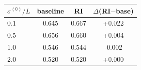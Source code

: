 \begin{tabular}{lccc}
\toprule
$\sigma^{(0)}/L$ & baseline & RI & $\Delta$(RI$-$base) \\
\midrule
0.1 & 0.645 & 0.667 & +0.022 \\
0.5 & 0.656 & 0.660 & +0.004 \\
1.0 & 0.546 & 0.544 & -0.002 \\
2.0 & 0.520 & 0.520 & +0.000 \\
\bottomrule
\end{tabular}
